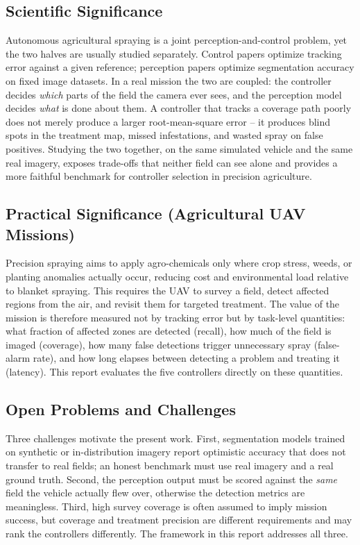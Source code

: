 \documentclass[12pt,a4paper]{article}
\begin{document}
\subsection{Scientific Significance}
Autonomous agricultural spraying is a joint perception-and-control problem, yet the
two halves are usually studied separately. Control papers optimize tracking error
against a given reference; perception papers optimize segmentation accuracy on fixed
image datasets. In a real mission the two are coupled: the controller decides
\emph{which} parts of the field the camera ever sees, and the perception model
decides \emph{what} is done about them. A controller that tracks a coverage path
poorly does not merely produce a larger root-mean-square error -- it produces blind
spots in the treatment map, missed infestations, and wasted spray on false
positives. Studying the two together, on the same simulated vehicle and the same
real imagery, exposes trade-offs that neither field can see alone and provides a
more faithful benchmark for controller selection in precision agriculture.

\subsection{Practical Significance (Agricultural UAV Missions)}
Precision spraying aims to apply agro-chemicals only where crop stress, weeds, or
planting anomalies actually occur, reducing cost and environmental load relative to
blanket spraying. This requires the UAV to survey a field, detect affected regions
from the air, and revisit them for targeted treatment. The value of the mission is
therefore measured not by tracking error but by task-level quantities: what fraction
of affected zones are detected (recall), how much of the field is imaged (coverage),
how many false detections trigger unnecessary spray (false-alarm rate), and how long
elapses between detecting a problem and treating it (latency). This report evaluates
the five controllers directly on these quantities.

\subsection{Open Problems and Challenges}
Three challenges motivate the present work. First, segmentation models trained on
synthetic or in-distribution imagery report optimistic accuracy that does not
transfer to real fields; an honest benchmark must use real imagery and a real
ground truth. Second, the perception output must be scored against the \emph{same}
field the vehicle actually flew over, otherwise the detection metrics are
meaningless. Third, high survey coverage is often assumed to imply mission success,
but coverage and treatment precision are different requirements and may rank the
controllers differently. The framework in this report addresses all three.
\end{document}
